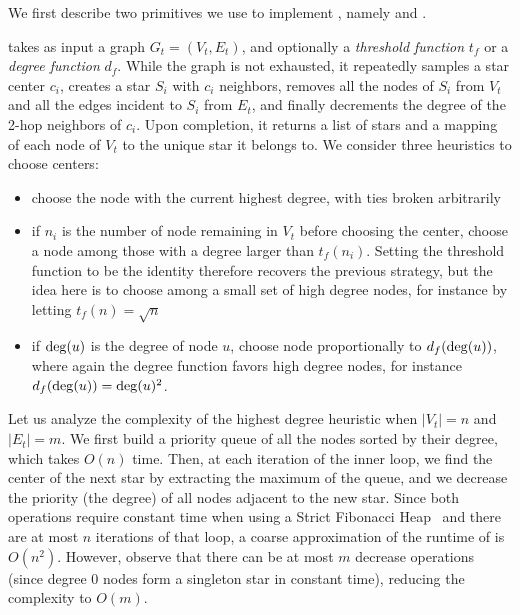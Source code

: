 We first describe two primitives we use to implement \gtx{}, namely \extractStar{} and
\collapseStar{}.

\extractStar{} takes as input a graph $G_t=(V_t, E_t)$, and optionally a \emph{threshold function}
$t_f$ or a \emph{degree function} $d_f$. While the graph is not exhausted, it repeatedly samples a
star center $c_i$, creates a star $S_i$ with $c_i$ neighbors, removes all the nodes of $S_i$ from
$V_t$ and all the edges incident to $S_i$ from $E_t$, and finally decrements the degree of the 2-hop
neighbors of $c_i$. Upon completion, it returns a list of stars and a mapping of
each node of $V_t$ to the unique star it belongs to. We consider three heuristics to choose centers:

\begin{itemize}
  \item choose the node with the current highest degree, with ties broken arbitrarily
  \item if $n_i$ is the number of node remaining in $V_t$ before choosing the \ith{} center, choose
    a node \uar{} among those with a degree larger than $t_f(n_i)$. Setting the threshold function
    to be the identity therefore recovers the previous strategy, but the idea here is to choose
    among a small set of high degree nodes, for instance by letting $t_f(n) = \sqrt{n}$
  \item if $\operatorname{deg}(u)$ is the degree of node $u$, choose node proportionally to $d_f(\operatorname{deg}(u))$, where
    again the degree function favors high degree nodes, for instance $d_f(\operatorname{deg}(u)) = \operatorname{deg}(u)^2$.
\end{itemize}

Let us analyze the complexity of the highest degree heuristic when $|V_t|=n$ and $|E_t|=m$. We first
build a priority queue of all the nodes sorted by their degree, which takes $O(n)$ time.  Then, at
each iteration of the inner loop, we find the center of the next star by extracting the maximum of
the queue, and we decrease the priority (\ie the degree) of all nodes adjacent to the new star.
Since both operations require constant time when using a Strict Fibonacci
Heap~\autocite{FibonacciHeaps12} and there are at most $n$ iterations of that loop, a coarse
approximation of the runtime of \extractStar{} is $O(n^2)$. However, observe that there can be at
most $m$ decrease operations (since degree $0$ nodes form a singleton star in constant time),
reducing the complexity to $O(m)$.

\bigskip

